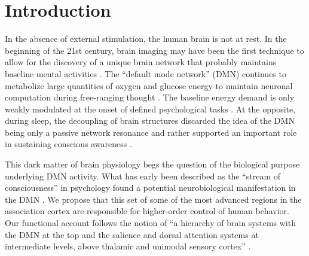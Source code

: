 \documentclass[10pt,letterpaper]{article}
\begin{document}

\section{Introduction}
%
In the absence of external stimulation, the human brain is not at rest.
In the beginning of the 21st century,
brain imaging may have been the first technique
to allow for the discovery of a unique brain network that probably maintains
baseline mental activities
\citep{raichle2001pnas, randy2008, bzdok2015resting}.
The ``default mode network'' (DMN) continues
to metabolize large quantities of
oxygen and glucose energy to maintain
neuronal computation
during free-ranging thought
\citep{kenet2003spontaneously, fiser2004small}.
The baseline energy demand is only weakly modulated
at the onset of defined psychological tasks \citep{raichle_baseline}.
At the opposite, during sleep, the
decoupling of brain structures discarded the idea of the DMN being
only a passive network resonance and rather supported an
important role in sustaining conscious awareness \citep{horovitz2009decoupling}.



This dark matter of brain physiology \citep{raichle2006brain} begs the question
of the biological purpose underlying DMN activity.
What has early been described as the ``stream of consciousness''
in psychology \citep{james1890principles}
found a potential neurobiological manifestation
in the DMN
\citep{shul1997, raichle2001pnas}.
We propose that this set of some of the most advanced regions in
the association cortex \citep{mesulam1998sensation, margulies2016situating}
are responsible for higher-order control of human behavior.
Our functional account follows the notion of
``a hierarchy of brain systems with
the DMN at the top and the salience and dorsal attention systems
at intermediate levels, above thalamic and unimodal sensory
cortex'' \citep{carhart2010default}.
\end{document}
